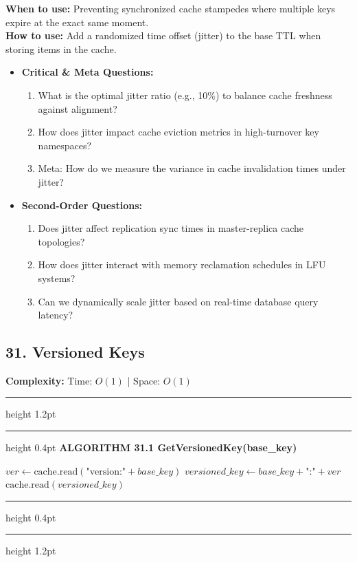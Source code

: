 \documentclass[11pt,a4paper]{article}
\newenvironment{textbookalgo}[2]{%
  \par\addvspace{1.2em}\noindent
  \hrule height 1.2pt
  \vspace{1.5pt}
  \hrule height 0.4pt
  \vspace{5pt}
  {\noindent\large\bfseries\sffamily ALGORITHM #1 \quad #2}
  \par\vspace{5pt}
  \RestyleAlgo{plain}
}{%
  \par\vspace{4pt}
  \hrule height 0.4pt
  \vspace{1.5pt}
  \hrule height 1.2pt
  \par\addvspace{1.2em}
}
\theoremstyle{definition}
\begin{document}
\noindent
\textbf{When to use:} Preventing synchronized cache stampedes where multiple keys expire at the exact same moment.\\
\textbf{How to use:} Add a randomized time offset (jitter) to the base TTL when storing items in the cache.
\begin{itemize}[leftmargin=*]
  \item[] \textbf{Critical \& Meta Questions:}
  \begin{enumerate}
    \item What is the optimal jitter ratio (e.g., 10\%) to balance cache freshness against alignment?
    \item How does jitter impact cache eviction metrics in high-turnover key namespaces?
    \item Meta: How do we measure the variance in cache invalidation times under jitter?
  \end{enumerate}
  \item[] \textbf{Second-Order Questions:}
  \begin{enumerate}
    \item Does jitter affect replication sync times in master-replica cache topologies?
    \item How does jitter interact with memory reclamation schedules in LFU systems?
    \item Can we dynamically scale jitter based on real-time database query latency?
  \end{enumerate}
\end{itemize}
\medskip


\clearpage
\subsection{31. Versioned Keys}

\noindent
\textbf{Complexity:} Time: $O(1)$ | Space: $O(1)$
\smallskip

\begin{textbookalgo}{31.1}{GetVersionedKey(base\_key)}
\begin{algorithm}[H]
$ver \leftarrow \text{cache.read}(\text{"version:"} + base\_key)$\;
$versioned\_key \leftarrow base\_key + \text{":"} + ver$\;
\Return $\text{cache.read}(versioned\_key)$\;
\end{algorithm}
\end{textbookalgo}
\end{document}
